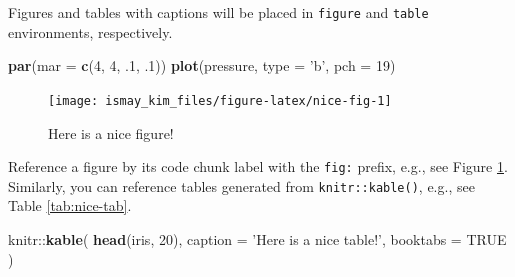 \documentclass[]{tufte-book}
\newenvironment{Shaded}{\begin{snugshade}}{\end{snugshade}}
\newcommand{\KeywordTok}[1]{\textcolor[rgb]{0.13,0.29,0.53}{\textbf{{#1}}}}
\newcommand{\DataTypeTok}[1]{\textcolor[rgb]{0.13,0.29,0.53}{{#1}}}
\newcommand{\DecValTok}[1]{\textcolor[rgb]{0.00,0.00,0.81}{{#1}}}
\newcommand{\StringTok}[1]{\textcolor[rgb]{0.31,0.60,0.02}{{#1}}}
\newcommand{\OtherTok}[1]{\textcolor[rgb]{0.56,0.35,0.01}{{#1}}}
\newcommand{\NormalTok}[1]{{#1}}
\begin{document}
Figures and tables with captions will be placed in \texttt{figure} and
\texttt{table} environments, respectively.

\begin{Shaded}
\begin{Highlighting}[]
\KeywordTok{par}\NormalTok{(}\DataTypeTok{mar =} \KeywordTok{c}\NormalTok{(}\DecValTok{4}\NormalTok{, }\DecValTok{4}\NormalTok{, .}\DecValTok{1}\NormalTok{, .}\DecValTok{1}\NormalTok{))}
\KeywordTok{plot}\NormalTok{(pressure, }\DataTypeTok{type =} \StringTok{'b'}\NormalTok{, }\DataTypeTok{pch =} \DecValTok{19}\NormalTok{)}
\end{Highlighting}
\end{Shaded}

\begin{figure}

{\centering \texttt{[image: ismay\_kim\_files/figure-latex/nice-fig-1]} 

}

\caption[Here is a nice figure!]{Here is a nice figure!}\label{fig:nice-fig}
\end{figure}

Reference a figure by its code chunk label with the \texttt{fig:}
prefix, e.g., see Figure \ref{fig:nice-fig}. Similarly, you can
reference tables generated from \texttt{knitr::kable()}, e.g., see Table
\ref{tab:nice-tab}.

\begin{Shaded}
\begin{Highlighting}[]
\NormalTok{knitr::}\KeywordTok{kable}\NormalTok{(}
  \KeywordTok{head}\NormalTok{(iris, }\DecValTok{20}\NormalTok{), }\DataTypeTok{caption =} \StringTok{'Here is a nice table!'}\NormalTok{,}
  \DataTypeTok{booktabs =} \OtherTok{TRUE}
\NormalTok{)}
\end{Highlighting}
\end{Shaded}
\end{document}
